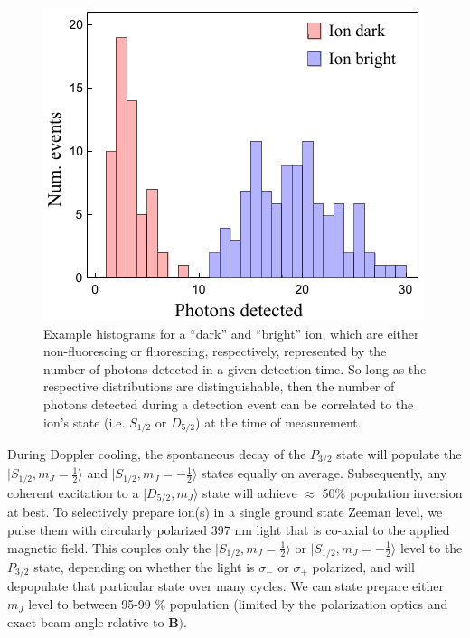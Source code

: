 \begin{figure}[t]
    \begin{center}
        \includegraphics{figures/2/Fig_histograms}
        \caption{\label{fig:histograms} Example histograms for a ``dark'' and ``bright'' ion, which are either non-fluorescing or fluorescing, respectively, represented by the number of photons detected in a given detection time. So long as the respective distributions are distinguishable, then the number of photons detected during a detection event can be correlated to the ion's state (i.e. $S_{1/2}$ or $D_{5/2}$) at the time of measurement.}
    \end{center}
\end{figure}

During Doppler cooling, the spontaneous decay of the $P_{3/2}$ state will populate the $|S_{1/2}, m_J = \frac{1}{2} \rangle$ and $|S_{1/2}, m_J = -\frac{1}{2} \rangle$ states equally on average. Subsequently, any coherent excitation to a $|D_{5/2}, m_J \rangle$ state will achieve $\approx$ 50\% population inversion at best. To selectively prepare ion(s) in a single ground state Zeeman level, we pulse them with circularly polarized 397 nm light that is co-axial to the applied magnetic field. This couples only the $|S_{1/2}, m_J = \frac{1}{2} \rangle$ or $|S_{1/2}, m_J = -\frac{1}{2} \rangle$ level to the $P_{3/2}$ state, depending on whether the light is $\sigma_-$ or $\sigma_+$ polarized, and will depopulate that particular state over many cycles. We can state prepare either $m_J$ level to between 95-99 \% population (limited by the polarization optics and exact beam angle relative to $\mathbf{B})$. 

